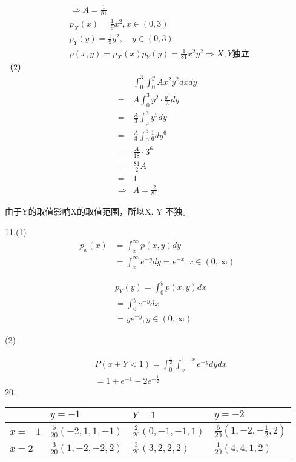 \documentclass[14pt]{scrartcl} %
\numberwithin{equation}{section} %
\numberwithin{figure}{section} %
\numberwithin{table}{section} %
\begin{document}
	$$
	\begin{aligned}
		& \Rightarrow A=\frac{1}{81} \\
		& p_{X}(x)=\frac{1}{9} x^{2}, x \in(0,3) \\
		& p_{Y}(y)=\frac{1}{9} y^{2}, \quad y \in(0,3) \\
		& p(x, y)=p_{X}(x) p_{Y}(y)=\frac{1}{81} x^{2} y^{2} \Rightarrow X, Y \text {独立 }
	\end{aligned}
	$$
	（2）
	$$
	\begin{aligned}
		& \int_{0}^{3} \int_{0}^{y} A x^{2} y^{2} d x d y \\
		= & A \int_{0}^{3} y^{2} \cdot \frac{y^{3}}{3} d y \\
		= & \frac{A}{3} \int_{0}^{3} y^{5} d y \\
		= & \frac{A}{3} \int_{0}^{3} \frac{1}{6} d y^{6} \\
		= & \frac{A}{18} \cdot 3^{6} \\
		= & \frac{81}{2} A \\
		= & 1 \\
		\Rightarrow & A=\frac{2}{81}
	\end{aligned}
	$$
	
	由于Y的取值影响X的取值范围，所以X. Y 不独。
	
	11.(1)
	$$
	\begin{aligned}
		p_{x}(x) & =\int_{x}^{\infty} p(x, y) d y \\
		& =\int_{x}^{\infty} e^{-y} d y=e^{-x}, x \in(0, \infty)
	\end{aligned}
	$$
	
	$$
	\begin{aligned}
		&p_Y(y)=\int_{0}^{y} p(x, y) d x \\
		& =\int_{0}^{y} e^{-y} d x \\
		& =y e^{-y}, y \in(0, \infty)
	\end{aligned}
	$$
	
	(2)
	
	\begin{align}
		&P(x+Y<1)=\int_{0}^{\frac{1}{2}} \int_{x}^{1-x} e^{-y} d y d x \\
		&=1+e^{-1}-2 e^{-\frac{1}{2}}
	\end{align}
	20. 
	\begin{center}
		\begin{tabular}{l|l|l|l}
			& $y=-1$ & $Y=1$ & $y=-2$ \\
			\hline
			$x=-1$ & $\frac{5}{20}(-2,1,1,-1)$ & $\frac{2}{20}(0,-1,-1,1)$ & $\frac{6}{20}\left(1,-2,-\frac{1}{2}, 2\right)$ \\
			\hline
			$x=2$ & $\frac{3}{20}(1,-2,-2,2)$ & $\frac{3}{20}(3,2,2,2)$ & $\frac{1}{20}(4,4,1,2)$ \\
			\hline
		\end{tabular}
	\end{center}
	
\end{document}
